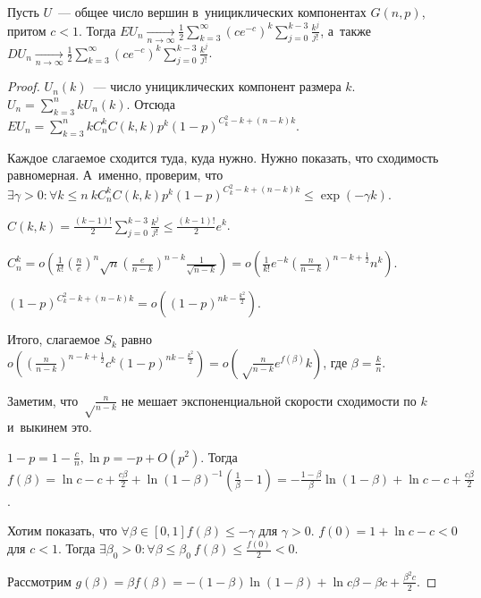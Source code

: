 \documentclass{article}
\begin{document}
\begin{theorem}
	Пусть $U$~--- общее число вершин в~унициклических компонентах $G(n, p)$, притом $c < 1$. Тогда
	$EU_n \underset{n\rightarrow \infty}\rightarrow \frac{1}{2} \sum_{k=3}^\infty (ce^{-c})^k
	\sum_{j=0}^{k-3} \frac{k^j}{j!}$, а~также
	$DU_n \underset{n\rightarrow \infty}\rightarrow \frac{1}{2} \sum_{k=3}^\infty (ce^{-c})^k
	\sum_{j=0}^{k-3} \frac{k^j}{j!}$.
\end{theorem}
\begin{proof}
	$U_n(k)$~--- число унициклических компонент размера $k$. $U_n = \sum\limits_{k=3}^n kU_n(k)$.
	Отсюда $EU_n = \sum\limits_{k=3}^n kC_n^k C(k, k) p^k (1-p)^{C_k^2 - k + (n - k)k}$.

	Каждое слагаемое сходится туда, куда нужно. Нужно показать, что сходимость равномерная. А~именно,
	проверим, что $\exists \gamma > 0: \forall k \le n\ kC_n^k C(k, k) p^k (1-p)^{C_k^2 - k + (n -
	k)k} \le \exp(-\gamma k)$.

	$C(k, k) = \frac{(k-1)!}{2} \sum\limits_{j=0}^{k-3} \frac{k^j}{j!} \le \frac{(k-1)!}{2} e^k$.

	$C_n^k = o\left(\frac{1}{k!} \left(\frac{n}{e}\right)^n \sqrt{n} \left(\frac{e}{n-k}\right)^{n-k}
	\frac{1}{\sqrt{n-k}}\right) = o\left(\frac{1}{k!} e^{-k} \left(\frac{n}{n-k}\right)^{n - k +
	\frac{1}{2}} n^k\right)$.

	$(1-p)^{C_k^2 - k + (n - k)k} = o\left((1-p)^{nk - \frac{k^2}{2}}\right)$.

	Итого, слагаемое $S_k$ равно
	$o\left( \left(\frac{n}{n-k}\right)^{n-k+\frac{1}{2}} c^k (1-p)^{nk - \frac{k^2}{2}} \right) =
	o\left( \sqrt\frac{n}{n-k} e^{f(\beta)} k\right)$, где $\beta = \frac{k}{n}$.

	Заметим, что $\sqrt\frac{n}{n-k}$ не мешает экспоненциальной скорости сходимости по $k$ и~выкинем
	это.

	$1 - p = 1 - \frac{c}{n}, \ln p = -p + O(p^2)$. Тогда $f(\beta) = \ln c - c + \frac{c\beta}{2} +
	\ln(1 - \beta)^{-1} \left( \frac{1}{\beta} - 1 \right) = -\frac{1 - \beta}{\beta} \ln(1 - \beta) +
	\ln c - c + \frac{c\beta}{2}$.

	Хотим показать, что $\forall \beta \in [0, 1] f(\beta) \le -\gamma$ для $\gamma > 0$. $f(0) = 1 +
	\ln c - c < 0$ для $c < 1$. Тогда $\exists \beta_0 > 0: \forall \beta \le \beta_0\ f(\beta) \le
	\frac{f(0)}{2} < 0$.

	Рассмотрим $g(\beta) = \beta f(\beta) = -(1 - \beta)\ln(1 - \beta) + \ln c \beta - \beta c +
	\frac{\beta^2 c}{2}$.


\end{proof}
\end{document}
